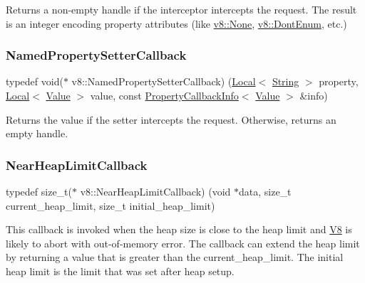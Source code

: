 Returns a non-\/empty handle if the interceptor intercepts the request. The result is an integer encoding property attributes (like \mbox{\hyperlink{namespacev8_a05f25f935e108a1ea2d150e274602b87a7ab4d58719c33b3ea2dfaefa29b111df}{v8\+::\+None}}, \mbox{\hyperlink{namespacev8_a05f25f935e108a1ea2d150e274602b87a471522265c2efddb22a61f2d6db2df9a}{v8\+::\+Dont\+Enum}}, etc.) \mbox{\label{namespacev8_a9587769513971dc7cb301b740d9e66b6}} 
\subsubsection{\texorpdfstring{Named\+Property\+Setter\+Callback}{NamedPropertySetterCallback}}
{\footnotesize\ttfamily typedef void($\ast$ v8\+::\+Named\+Property\+Setter\+Callback) (\mbox{\hyperlink{classv8_1_1Local}{Local}}$<$ \mbox{\hyperlink{classv8_1_1String}{String}} $>$ property, \mbox{\hyperlink{classv8_1_1Local}{Local}}$<$ \mbox{\hyperlink{classv8_1_1Value}{Value}} $>$ value, const \mbox{\hyperlink{classv8_1_1PropertyCallbackInfo}{Property\+Callback\+Info}}$<$ \mbox{\hyperlink{classv8_1_1Value}{Value}} $>$ \&info)}

Returns the value if the setter intercepts the request. Otherwise, returns an empty handle. \mbox{\label{namespacev8_af4357cae607e45cd9e9c4fda1cc03218}} 
\subsubsection{\texorpdfstring{Near\+Heap\+Limit\+Callback}{NearHeapLimitCallback}}
{\footnotesize\ttfamily typedef size\+\_\+t($\ast$ v8\+::\+Near\+Heap\+Limit\+Callback) (void $\ast$data, size\+\_\+t current\+\_\+heap\+\_\+limit, size\+\_\+t initial\+\_\+heap\+\_\+limit)}

This callback is invoked when the heap size is close to the heap limit and \mbox{\hyperlink{classv8_1_1V8}{V8}} is likely to abort with out-\/of-\/memory error. The callback can extend the heap limit by returning a value that is greater than the current\+\_\+heap\+\_\+limit. The initial heap limit is the limit that was set after heap setup. \mbox{\label{namespacev8_a8ce54c75241be41ff6a25e9944eefd2a}} 
